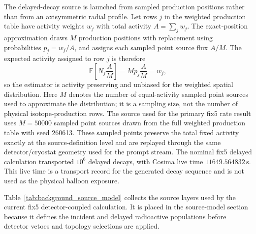 \documentclass[preprint,12pt]{elsarticle}
\begin{document}
The delayed-decay source is launched from sampled production positions rather than from an axisymmetric radial profile. Let rows $j$ in the weighted production table have activity weights $w_j$ with total activity $A=\sum_j w_j$. The exact-position approximation draws $M$ production positions with replacement using probabilities $p_j=w_j/A$, and assigns each sampled point source flux $A/M$. The expected activity assigned to row $j$ is therefore
\begin{equation}
  \mathbb{E}\!\left[N_j\frac{A}{M}\right] = M p_j \frac{A}{M} = w_j ,
\end{equation}
so the estimator is activity preserving and unbiased for the weighted spatial distribution. Here $M$ denotes the number of equal-activity sampled point sources used to approximate the distribution; it is a sampling size, not the number of physical isotope-production rows. The source used for the primary fix5 rate result uses $M=50000$ sampled point sources drawn from the full weighted production table with seed 260613. These sampled points preserve the total fixed activity exactly at the source-definition level and are replayed through the same detector/cryostat geometry used for the prompt stream. The nominal fix5 delayed calculation transported $10^6$ delayed decays, with Cosima live time $11649.564832\,\mathrm{s}$. This live time is a transport record for the generated decay sequence and is not used as the physical balloon exposure.

Table~\ref{tab:background_source_model} collects the source layers used by the current fix5 detector-coupled calculation. It is placed in the source-model section because it defines the incident and delayed radioactive populations before detector vetoes and topology selections are applied.
\end{document}
